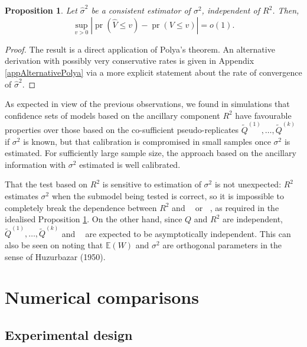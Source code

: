 \documentclass[10pt, reqno]{amsart}
\newtheorem{proposition}{Proposition}[section]
\numberwithin{equation}{section}
\newcommand{\mrcv}{\mathop{\hat{\sigma}^2_{\mathrm{mrcv}}}}
\newcommand{\rcv}{\mathop{\hat{\sigma}^2_{\mathrm{rcv}}}}
\newcommand{\pr}{\mathop{\mathrm{pr}}}
\newcommand{\EE}{\mathbb{E}}
\begin{document}
\begin{proposition}\label{propPValueYanbo}
	Let $\hat\sigma^2$ be a consistent estimator of $\sigma^2$, independent of $R^2$. Then, 
	\[
	\sup_{v>0}|\pr(\hat V \leq v) - \pr( V \leq v)| = o(1).
	\]      
\end{proposition}

\begin{proof}
	The result is a direct application of Polya's theorem. An alternative derivation with possibly very conservative rates is given in Appendix \ref{appAlternativePolya} via a more explicit statement about the rate of convergence of $\hat\sigma^2$.
\end{proof}

As expected in view of the previous observations, we found in simulations that confidence sets of models based on the ancillary component $R^2$ have favourable properties over those based on the co-sufficient pseudo-replicates $\tilde{Q}^{(1)}, \ldots, \tilde{Q}^{(k)}$ if $\sigma^2$ is known, but that calibration is compromised in small samples once $\sigma^2$ is estimated. For sufficiently large sample size, the approach based on the ancillary information with $\sigma^2$ estimated is well calibrated. 

That the test based on $R^2$ is sensitive to estimation of $\sigma^2$ is not unexpected: $R^2$ estimates $\sigma^2$ when the submodel being tested is correct, so it is impossible to completely break the dependence between $R^2$ and $\rcv$ or $\mrcv$, as required in the idealised Proposition \ref{propPValueYanbo}. On the other hand, since $Q$ and $R^2$ are independent, $\tilde{Q}^{(1)}, \ldots, \tilde{Q}^{(k)}$ and $\mrcv$ are expected to be asymptotically independent. This can also be seen on noting that $\EE(W)$ and $\sigma^2$ are orthogonal parameters in the sense of Huzurbazar (1950).


\section{Numerical comparisons}\label{secSim}

\subsection{Experimental design}
\end{document}
